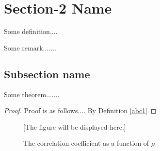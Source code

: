 \section{Section-2 Name}
\begin{definition}\label{abc2}
Some definition....
\end{definition}

\begin{remark}
Some remark.......
\end{remark}

\subsection{Subsection name}

\begin{theorem}
Some theorem.......
\end{theorem}

\begin{proof}
Proof is as follows.... By Definition \ref{abc1}
\end{proof}


\begin{figure}[hH]

[The figure will be displayed here.]

\caption{The correlation coefficient as a function of $\rho$}
\end{figure}


